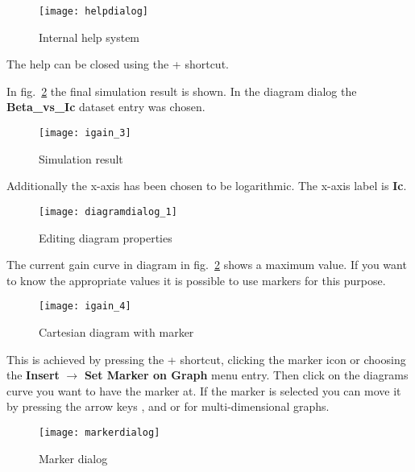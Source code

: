 \begin{figure}[ht]
  \centering
  \texttt{[image: helpdialog]}
  \caption{Internal help system}
  \label{fig:helpdialog}
\end{figure}
\FloatBarrier

The help can be closed using the \Ctrl+ shortcut.


In fig.~\ref{fig:igain_3} the final simulation result is shown.  In
the diagram dialog the \textbf{Beta\_vs\_Ic} dataset entry was chosen.

\begin{figure}[ht]
  \centering
  \texttt{[image: igain\_3]}
  \caption{Simulation result}
  \label{fig:igain_3}
\end{figure}
\FloatBarrier

Additionally the x-axis has been chosen to be logarithmic.  The
x-axis label is \textbf{Ic}.

\begin{figure}[ht]
  \centering
  \texttt{[image: diagramdialog\_1]}
  \caption{Editing diagram properties}
  \label{diagramdialog_1}
\end{figure}
\FloatBarrier


The current gain curve in diagram in fig.~\ref{fig:igain_3} shows a
maximum value.  If you want to know the appropriate values it is
possible to use markers for this purpose.

\begin{figure}[ht]
  \centering
  \texttt{[image: igain\_4]}
  \caption{Cartesian diagram with marker}
  \label{fig:igain_4}
\end{figure}
\FloatBarrier

This is achieved by pressing the \Ctrl+ shortcut,
clicking the marker icon or choosing the \textbf{Insert} $\rightarrow$
\textbf{Set Marker on Graph} menu entry.  Then click on the diagrams
curve you want to have the marker at.  If the marker is selected you
can move it by pressing the arrow keys \LArrow, \RArrow and \UArrow or
\DArrow for multi-dimensional graphs.

\begin{figure}[ht]
  \centering
  \texttt{[image: markerdialog]}
  \caption{Marker dialog}
  \label{fig:imarkerdialog}
\end{figure}
\FloatBarrier

